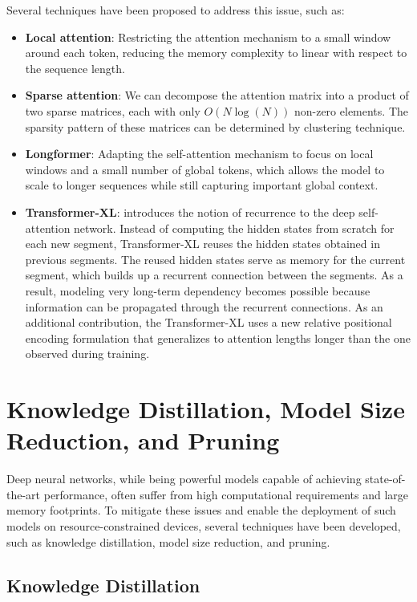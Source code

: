 \documentclass[12pt]{article}
\begin{document}
Several techniques have been proposed to address this issue, such as:
\begin{itemize}
\item \textbf{Local attention}: Restricting the attention mechanism to a small window around each token, reducing the memory complexity to linear with respect to the sequence length.
\item \textbf{Sparse attention}: We can decompose the attention matrix into a product of two sparse matrices, each with only $O(N \log(N))$ non-zero elements. The sparsity pattern of these matrices can be determined by clustering technique.
\item \textbf{Longformer}: Adapting the self-attention mechanism to focus on local windows and a small number of global tokens, which allows the model to scale to longer sequences while still capturing important global context.
\item \textbf{Transformer-XL}: introduces the notion of recurrence to the deep self-attention network. Instead of computing the hidden states from scratch for each new segment, Transformer-XL reuses the hidden states obtained in previous segments. The reused hidden states serve as memory for the current segment, which builds up a recurrent connection between the segments. As a result, modeling very long-term dependency becomes possible because information can be propagated through the recurrent connections. As an additional contribution, the Transformer-XL uses a new relative positional encoding formulation that generalizes to attention lengths longer than the one observed during training.
\end{itemize}


\section{Knowledge Distillation, Model Size Reduction, and Pruning}

Deep neural networks, while being powerful models capable of achieving state-of-the-art performance, often suffer from high computational requirements and large memory footprints. To mitigate these issues and enable the deployment of such models on resource-constrained devices, several techniques have been developed, such as knowledge distillation, model size reduction, and pruning.

\subsection{Knowledge Distillation}
\end{document}
